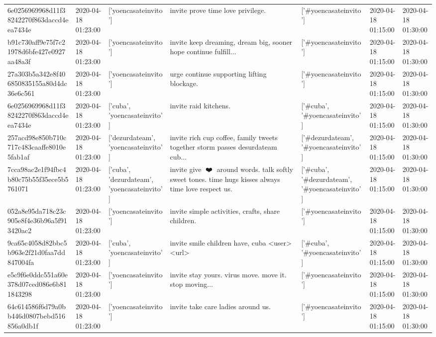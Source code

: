 \begin{tabular}{lllllll}
6e0256969968d11f38242270f863daccd4eea7434e & 2020-04-18 01:23:00 & ['yoencasateinvito'] & invite prove time love privilege. & ['#yoencasateinvito'] & 2020-04-18 01:15:00 & 2020-04-18 01:30:00 \\
b91c730aff9e75f7c21978d6bfe427e0927aa48a3f & 2020-04-18 01:23:00 & ['yoencasateinvito'] & invite keep dreaming, dream big, sooner hope continue fulfill... & ['#yoencasateinvito'] & 2020-04-18 01:15:00 & 2020-04-18 01:30:00 \\
27a303b5a342e8f406850835155a80d4dc36e6c561 & 2020-04-18 01:23:00 & ['yoencasateinvito'] & urge continue supporting lifting blockage. & ['#yoencasateinvito'] & 2020-04-18 01:15:00 & 2020-04-18 01:30:00 \\
6e0256969968d11f38242270f863daccd4eea7434e & 2020-04-18 01:23:00 & ['cuba', 'yoencasateinvito'] & invite raid kitchens. & ['#cuba', '#yoencasateinvito'] & 2020-04-18 01:15:00 & 2020-04-18 01:30:00 \\
257acd98e850b710c717c483caaffe8010e5fab1af & 2020-04-18 01:23:00 & ['dezurdateam', 'yoencasateinvito'] & invite rich cup coffee, family tweets together storm passes desurdateam cub... & ['#dezurdateam', '#yoencasateinvito'] & 2020-04-18 01:15:00 & 2020-04-18 01:30:00 \\
7cca98ac2e1f94fbc4b80c75b55f35ece5b5761071 & 2020-04-18 01:23:00 & ['cuba', 'dezurdateam', 'yoencasateinvito'] & invite give 💚❤️💜 around words. talk softly sweet tones. time hugs kisses always time love respect us. & ['#cuba', '#dezurdateam', '#yoencasateinvito'] & 2020-04-18 01:15:00 & 2020-04-18 01:30:00 \\
052a8e95da718c23c905e8f4e36b96a5f913420ac2 & 2020-04-18 01:23:00 & ['yoencasateinvito'] & invite simple activities, crafts, share children. & ['#yoencasateinvito'] & 2020-04-18 01:15:00 & 2020-04-18 01:30:00 \\
9ca65c4058d82bbc5b963e2f21d0faa7dd847004fa & 2020-04-18 01:23:00 & ['cuba', 'yoencasateinvito'] & invite smile children have, cuba <user> <url> & ['#cuba', '#yoencasateinvito'] & 2020-04-18 01:15:00 & 2020-04-18 01:30:00 \\
e5c9f6e0ddc551a60e378d07ced086e6b811843298 & 2020-04-18 01:23:00 & ['yoencasateinvito'] & invite stay yours. virus move. move it. stop moving... & ['#yoencasateinvito'] & 2020-04-18 01:15:00 & 2020-04-18 01:30:00 \\
64c614586f6d79a0bb446d0807bebd516856a0db1f & 2020-04-18 01:23:00 & ['yoencasateinvito'] & invite take care ladies around us. & ['#yoencasateinvito'] & 2020-04-18 01:15:00 & 2020-04-18 01:30:00 \\

\end{tabular}

